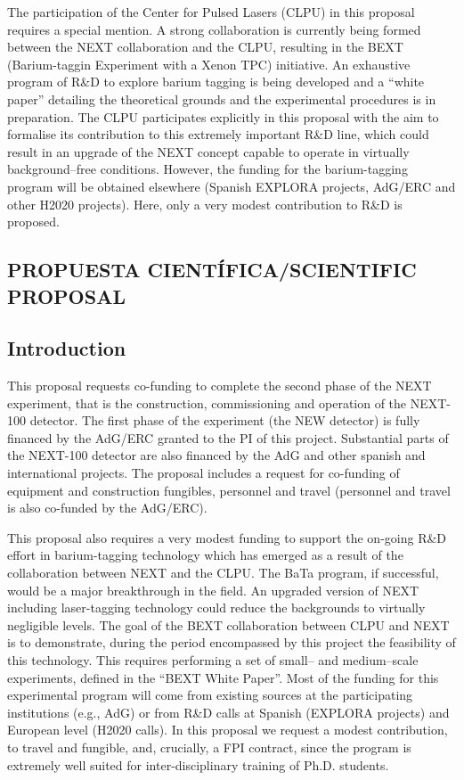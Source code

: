 \documentclass[a4paper,11pt,oneside]{article}
\begin{document}
The participation of the Center for Pulsed Lasers (CLPU) in this proposal requires a special mention. A strong collaboration is currently being formed between the NEXT collaboration and the CLPU, resulting in the BEXT (Barium-taggin Experiment with a Xenon TPC) initiative. An exhaustive program of R\&D to explore barium tagging is being developed and a ``white paper'' detailing the theoretical grounds and the experimental procedures is in preparation. The CLPU participates explicitly in this proposal with the aim to formalise its contribution to this extremely important R\&D line, which could result in an upgrade of the NEXT concept capable to operate in virtually background--free conditions. However, the funding for the barium-tagging program will be obtained elsewhere (Spanish EXPLORA projects, AdG/ERC and other H2020 projects). Here, only a very modest contribution to R\&D is proposed. 

\subsection{\bf PROPUESTA CIENTÍFICA/SCIENTIFIC PROPOSAL}
\subsection{\sc Introduction}
This proposal requests co-funding to complete the second phase of the NEXT experiment, that is the construction, commissioning and operation of the NEXT-100 detector. The first phase of the experiment (the NEW detector) is fully financed by the AdG/ERC granted to the PI of this project. Substantial parts of the NEXT-100 detector are also financed by the AdG and other spanish and international projects. The proposal includes a request for co-funding of equipment and construction fungibles, personnel and travel (personnel and travel is also co-funded by the AdG/ERC). 

This proposal also requires a very modest funding to support the on-going R\&D effort in barium-tagging technology which has emerged as a result of the collaboration between NEXT and the CLPU. The {\sc BaTa} program, if successful, would be a major breakthrough in the field. An upgraded version of NEXT including laser-tagging technology could reduce the backgrounds to virtually negligible levels. The goal of the BEXT collaboration between CLPU and NEXT is to demonstrate, during the period encompassed by this project the feasibility of this technology. This requires performing a set of small-- and medium--scale experiments, defined in the ``BEXT White Paper''. Most of the funding for this experimental program will come from existing sources at the participating institutions (e.g., AdG) or from R\&D calls at Spanish (EXPLORA projects) and European level (H2020 calls). In this proposal we request a modest contribution, to travel and fungible, and, crucially, a FPI contract, since the program is extremely well suited for inter-disciplinary training of Ph.D. students.  
\end{document}
